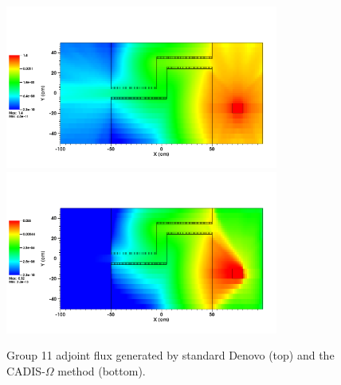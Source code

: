 \documentclass[12pt]{article}
\begin{document}
\begin{figure}
  \begin{center}
    \includegraphics[width=0.80\textwidth]{./images/maze2_adjoint_group11_adjusted_update.png}
    \includegraphics[width=0.80\textwidth]{./images/maze2_myflux_group11_adjusted_update.png}
    \caption[]{\label{fig::adjoint_fluxes_group11} Group 11 adjoint flux generated by standard Denovo (top) and the CADIS-$\Omega$ method (bottom).}
  \end{center}
\end{figure}
\end{document}
